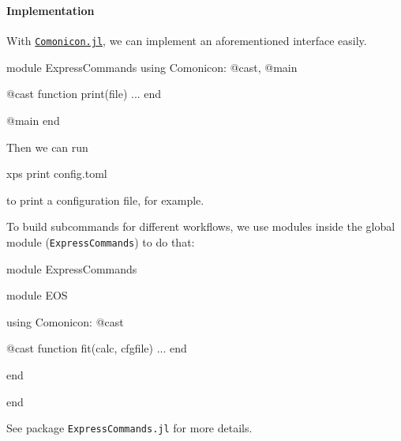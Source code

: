 \begin{frame}
    \frametitle{\subsecname}
    \framesubtitle{Implementation}

    With \href{https://github.com/comonicon/Comonicon.jl}{\texttt{Comonicon.jl}}, we can implement
    an aforementioned interface easily.

        {\scriptsize
            \begin{algorithmblock}
                \begin{juliaverbatim}
module ExpressCommands
using Comonicon: @cast, @main

@cast function print(file)
    ...
end

@main
end
                \end{juliaverbatim}
            \end{algorithmblock}
        }

    Then we can run

        {\scriptsize
            \begin{algorithmblock}
                xps print config.toml
            \end{algorithmblock}
        }

    to print a configuration file, for example.

    \framebreak

    To build subcommands for different workflows, we use modules inside the global module
    (\texttt{ExpressCommands}) to do that:

    {\scriptsize
    \begin{algorithmblock}
        \begin{juliaverbatim}
module ExpressCommands

module EOS

using Comonicon: @cast

@cast function fit(calc, cfgfile)
    ...
end

end

end
        \end{juliaverbatim}
    \end{algorithmblock}
    }

    See package \texttt{ExpressCommands.jl} for more details.
\end{frame}


